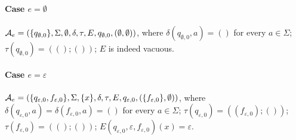 %  









\paragraph{Case $e =\emptyset$} $\mathcal{A}_e = (\{q_{\emptyset, 0}\}, \Sigma, \emptyset, \delta, \tau, E, q_{\emptyset, 0}, (\emptyset, \emptyset))$, where $\delta(q_{\emptyset, 0}, a) = ()$ for every $a \in \Sigma$; $\tau(q_{\emptyset, 0}) = ((); ())$; $E$ is indeed vacuous.
		

\paragraph{Case $e = \varepsilon$} $\mathcal{A}_e = (\{q_{\varepsilon, 0}, f_{\varepsilon,0}\}, \Sigma, \{x \}, \delta, \tau, E, q_{\varepsilon,0}, (\{f_{\varepsilon,0}\}, \emptyset))$, 
%
where $\delta(q_{\varepsilon,0}, a) = \delta(f_{\varepsilon,0}, a) = ()$ for every $a \in \Sigma$; $\tau(q_{\varepsilon,0}) = ((f_{\varepsilon,0}); ())$;  $\tau(f_{\varepsilon,0}) = ((); ())$; %
$E(q_{\varepsilon,0}, \varepsilon, f_{\varepsilon,0})(x) = \varepsilon$.
		
